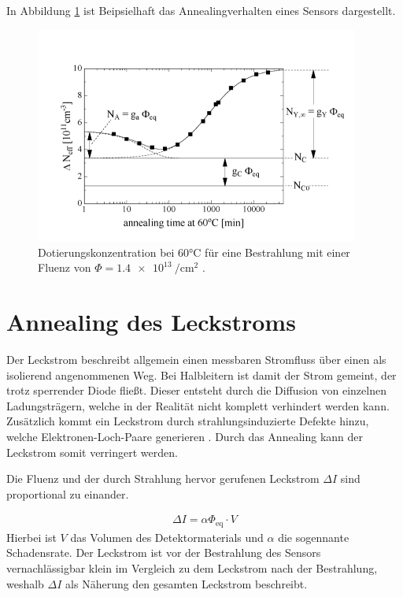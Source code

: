 In Abbildung \ref{fig:n_eff_beispiel} ist Beipsielhaft das Annealingverhalten eines
Sensors dargestellt.

\begin{figure}
  \includegraphics[width=0.95\textwidth]{logos/n_eff_beispiel.PNG}
  \caption{Dotierungskonzentration bei 60°C für eine Bestrahlung mit einer Fluenz
  von $\Phi=\SI{1.4e13}{\per\centi\meter\squared}$ .\cite{moll}}
  \label{fig:n_eff_beispiel}
\end{figure}



\section{Annealing des Leckstroms}
Der Leckstrom beschreibt allgemein einen messbaren Stromfluss über einen als isolierend
angenommenen Weg. Bei Halbleitern ist damit der Strom gemeint, der trotz sperrender
Diode fließt. Dieser entsteht durch die Diffusion von einzelnen Ladungsträgern, welche
in der Realität nicht komplett verhindert werden kann.
Zusätzlich kommt ein Leckstrom durch strahlungsinduzierte Defekte hinzu, welche
Elektronen-Loch-Paare generieren \cite{moll}.
Durch das Annealing kann der Leckstrom somit verringert werden.

Die Fluenz und der durch Strahlung hervor gerufenen Leckstrom $\Delta I$ sind
proportional zu einander.

\begin{align}
  \Delta I = \alpha \Phi_{\mathrm{eq}} \cdot V
\end{align}
Hierbei ist $V$ das Volumen des Detektormaterials und $\alpha$ die
sogennante Schadensrate. Der Leckstrom ist vor der Bestrahlung des Sensors
vernachlässigbar klein im Vergleich zu dem Leckstrom nach der Bestrahlung,
weshalb $\Delta I$ als Näherung den gesamten Leckstrom beschreibt.

